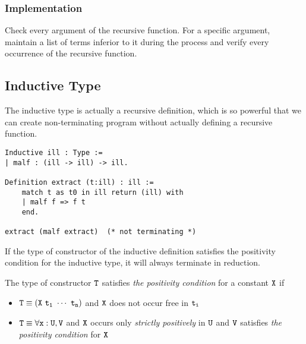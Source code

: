 \subsubsection*{Implementation}

Check every argument of the recursive function. For a specific argument, maintain a list of terms inferior to it 
during the process and verify every occurrence of the recursive function.

\subsection{Inductive Type}

The inductive type is actually a recursive definition, which is so powerful that we can create non-terminating program
without actually defining a recursive function.
\begin{center}
\begin{minipage}{0.7\textwidth}
\begin{verbatim}
Inductive ill : Type :=                
| malf : (ill -> ill) -> ill.          
                                       
Definition extract (t:ill) : ill :=       
    match t as t0 in ill return (ill) with 
    | malf f => f t
    end.                                    

extract (malf extract)  (* not terminating *)
\end{verbatim}
\end{minipage}
\end{center}

\begin{Prop}
If the type of constructor of the inductive definition satisfies the positivity condition for
the inductive type, it will always terminate in reduction.
\end{Prop}

\begin{Def}[Positivity]
The type of constructor $\tt T$ satisfies \textit{the positivity condition} for a constant $\tt X$ if
\begin{itemize}\normalfont
    \item $\tt T\equiv (X\ t_1\ \cdots\ t_n)$ and $\tt X$ does not occur free in $\tt t_i$
    \item $\tt T\equiv \forall x:U,V$ and $\tt X$ occurs only \textit{strictly positively} in $\tt U$ and
        $\tt V$ satisfies \textit{the positivity condition} for $\tt X$
\end{itemize}
\end{Def}

